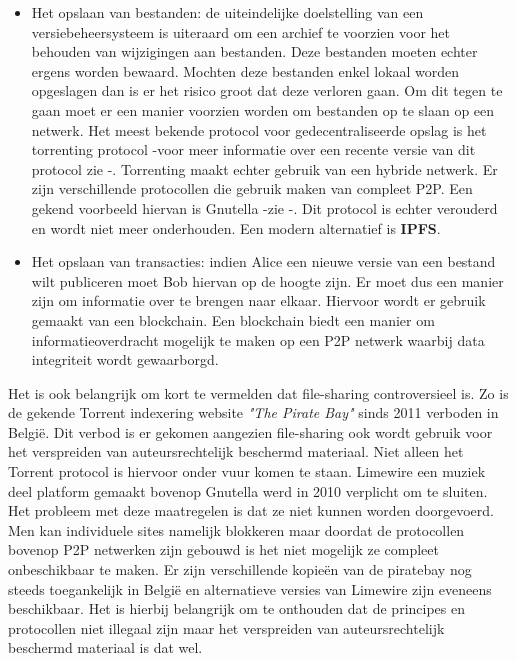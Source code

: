 \begin{itemize}
\item Het opslaan van bestanden: de uiteindelijke doelstelling van een versiebeheersysteem is uiteraard om een archief te voorzien voor het behouden van wijzigingen aan bestanden. Deze bestanden moeten echter ergens worden bewaard. Mochten deze bestanden enkel lokaal worden opgeslagen dan is er het risico groot dat deze verloren gaan. Om dit tegen te gaan moet er een manier voorzien worden om bestanden op te slaan op een netwerk. Het meest bekende protocol voor gedecentraliseerde opslag is het torrenting protocol -voor meer informatie over een recente versie van dit protocol zie \autocite{Cohen2008}-. Torrenting maakt echter gebruik van een hybride netwerk. Er zijn verschillende protocollen die gebruik maken van compleet P2P. Een gekend voorbeeld hiervan is Gnutella -zie \autocite{Klingberg2002}-. Dit protocol is echter verouderd en wordt niet meer onderhouden. Een modern alternatief is \textbf{IPFS}.\\

\item Het opslaan van transacties: indien Alice een nieuwe versie van een bestand wilt publiceren moet Bob hiervan op de hoogte zijn. Er moet dus een manier zijn om informatie over te brengen naar elkaar. Hiervoor wordt er gebruik gemaakt van een blockchain. Een blockchain biedt een manier om informatieoverdracht mogelijk te maken op een P2P netwerk waarbij data integriteit wordt gewaarborgd. 
\end{itemize}

Het is ook belangrijk om kort te vermelden dat file-sharing controversieel is. Zo is de gekende Torrent indexering website \textit{"The Pirate Bay"} sinds 2011 verboden in België. Dit verbod is er gekomen aangezien file-sharing ook wordt gebruik voor het verspreiden van auteursrechtelijk beschermd materiaal. Niet alleen het Torrent protocol is hiervoor onder vuur komen te staan. Limewire een muziek deel platform gemaakt bovenop Gnutella werd in 2010 verplicht om te sluiten. Het probleem met deze maatregelen is dat ze niet kunnen worden doorgevoerd. Men kan individuele sites namelijk  blokkeren maar doordat de protocollen bovenop P2P netwerken zijn gebouwd is het niet mogelijk ze compleet onbeschikbaar te maken. Er zijn verschillende kopieën van de piratebay nog steeds toegankelijk in België en alternatieve versies van Limewire zijn eveneens beschikbaar. Het is hierbij belangrijk om te onthouden dat de principes en protocollen niet illegaal zijn maar het verspreiden van auteursrechtelijk beschermd materiaal is dat wel.\\


